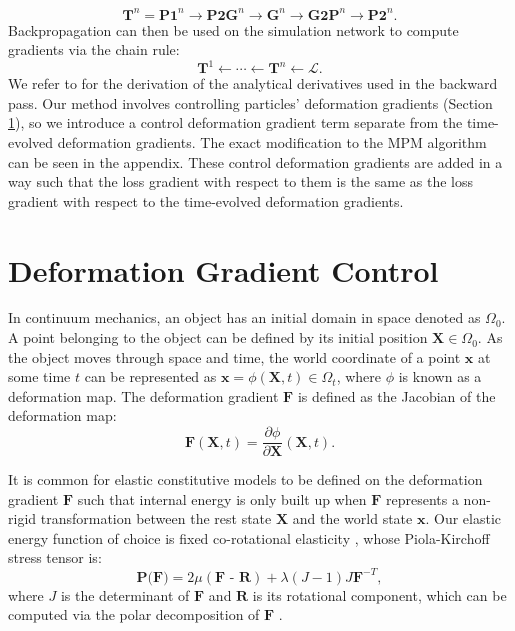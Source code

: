     \begin{equation}
        \textbf{T}^n = \textbf{P1}^n \rightarrow \textbf{P2G}^n \rightarrow \textbf{G}^n \rightarrow \textbf{G2P}^n \rightarrow \textbf{P2}^n .
    \end{equation}
    Backpropagation can then be used on the simulation network to compute gradients via the chain rule:
    \begin{equation}
        \textbf{T}^1 \leftarrow \cdots \leftarrow \textbf{T}^n \leftarrow \mathcal{L} .
    \end{equation}
    We refer to \citep{2018-ChainQueen} for the derivation of the analytical derivatives used in the backward pass. 
    Our method involves controlling particles' deformation gradients (Section \ref{sec:control}), so we introduce a control deformation gradient term separate from the time-evolved deformation gradients.
    The exact modification to the {MPM} algorithm can be seen in the appendix.
    These control deformation gradients are added in a way such that the loss gradient with respect to them is the same as the loss gradient with respect to the time-evolved deformation gradients.

\section{Deformation Gradient Control}
\label{sec:control}

    In continuum mechanics, an object has an initial domain in space
    denoted as $\Omega_0$. A point belonging to the object can be defined by its initial position $\textbf{X} \in \Omega_0$. As the object moves through space and time, the world coordinate of a point $\textbf{x}$ at some time $t$ can be represented as $\textbf{x} = \phi(\textbf{X}, t) \in \Omega_t$, where $\phi$ is known as a deformation map. The deformation gradient $\textbf{F}$ is defined as the Jacobian of the deformation map:
    \begin{equation}
        \mathbf{F}(\mathbf{X}, t) = \frac{\partial \phi}{\partial \mathbf{X}}(\mathbf{X}, t).
    \end{equation}
    
    It is common for elastic constitutive models to be defined on
    the deformation gradient $\textbf{F}$ such that internal energy is only built
    up when $\textbf{F}$ represents a non-rigid transformation between the rest
    state $\textbf{X}$ and the world state $\textbf{x}$. Our elastic energy function of choice is fixed co-rotational elasticity \citep{stomakhin2012energetically, jiang2016material}, whose Piola-Kirchoff stress tensor is:
    \begin{equation}
        \textbf{P(F)} = 2\mu(\textbf{F - R}) + \lambda(J-1)J\textbf{F}^{-T},
    \end{equation}
    where $J$ is the determinant of $\mathbf{F}$ and $\mathbf{R}$ is its rotational component, which can be computed via the polar decomposition of $\mathbf{F}$ \citep{gast2016implicit}.
    
